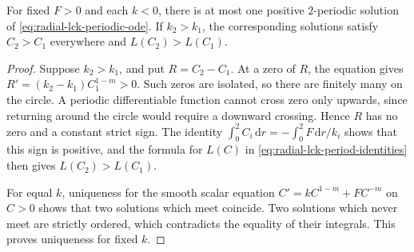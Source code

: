 \begin{lemma}\label{lem:radial-lck-periodic-order}
For fixed $F>0$ and each $k<0$, there is at most one positive $2$-periodic solution of \eqref{eq:radial-lck-periodic-ode}. If $k_2>k_1$, the corresponding solutions satisfy $C_2>C_1$ everywhere and $L(C_2)>L(C_1)$.
\end{lemma}
\begin{proof}
Suppose $k_2>k_1$, and put $R=C_2-C_1$. At a zero of $R$, the equation gives $R'=(k_2-k_1)C_1^{1-m}>0$. Such zeros are isolated, so there are finitely many on the circle. A periodic differentiable function cannot cross zero only upwards, since returning around the circle would require a downward crossing. Hence $R$ has no zero and a constant strict sign. The identity $\int_0^2C_i\,\mathrm dr=-\int_0^2F\,\mathrm dr/k_i$ shows that this sign is positive, and the formula for $L(C)$ in \eqref{eq:radial-lck-period-identities} then gives $L(C_2)>L(C_1)$.

For equal $k$, uniqueness for the smooth scalar equation $C'=kC^{1-m}+FC^{-m}$ on $C>0$ shows that two solutions which meet coincide. Two solutions which never meet are strictly ordered, which contradicts the equality of their integrals. This proves uniqueness for fixed $k$.
\end{proof}


